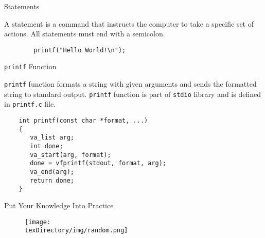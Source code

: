 \documentclass[compress]{beamer}
\begin{document}
\begin{slide}
	\begin{block}{Statements}

	A statement is a command that instructs the computer to take a specific set of actions.
	All statements must end with a semicolon.

	\begin{verbatim}
	    printf("Hello World!\n");
	\end{verbatim}

	\end{block}
\end{slide}

\begin{slide}
	\begin{block}{\texttt{printf} Function}

	\texttt{printf} function formats a string with given arguments and sends the formatted string to standard output.
	\texttt{printf} function is part of \texttt{stdio} library and is defined in \texttt{printf.c} file.

	\begin{verbatim}
	int printf(const char *format, ...)
	{
	   va_list arg;
	   int done;
	   va_start(arg, format);
	   done = vfprintf(stdout, format, arg);
	   va_end(arg);
	   return done;
	}
	\end{verbatim}

	\end{block}
\end{slide}

\begin{slide}
	\begin{block}{Put Your Knowledge Into Practice}

	\begin{figure}
	\texttt{[image: \\texDirectory/img/random.png]}
	\end{figure}

	\end{block}
\end{slide}
\end{document}
